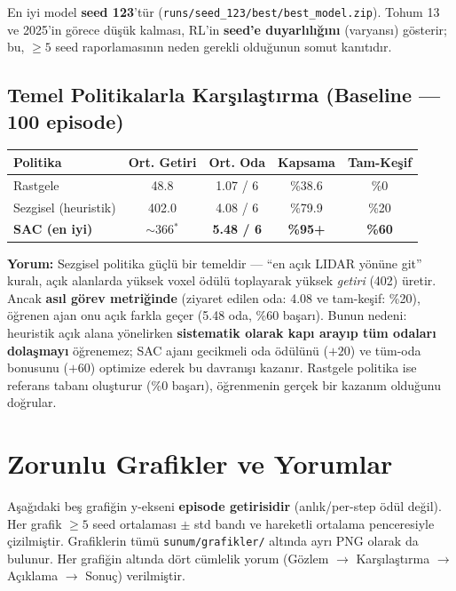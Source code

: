 \documentclass[11pt,a4paper]{article}
\begin{document}
En iyi model \textbf{seed 123}'tür (\texttt{runs/seed\_123/best/best\_model.zip}).
Tohum 13 ve 2025'in görece düşük kalması, RL'in \textbf{seed'e duyarlılığını}
(varyansı) gösterir; bu, $\ge 5$ seed raporlamasının neden gerekli olduğunun
somut kanıtıdır.

\subsection{Temel Politikalarla Karşılaştırma (Baseline --- 100 episode)}\label{sec:baseline}
\begin{center}
\begin{tabular}{lcccc}
\toprule
\textbf{Politika} & \textbf{Ort. Getiri} & \textbf{Ort. Oda} & \textbf{Kapsama} & \textbf{Tam-Keşif} \\
\midrule
Rastgele & 48.8 & 1.07 / 6 & \%38.6 & \%0 \\
Sezgisel (heuristik) & 402.0 & 4.08 / 6 & \%79.9 & \%20 \\
\textbf{SAC (en iyi)} & $\sim$366$^{*}$ & \textbf{5.48 / 6} & \textbf{\%95+} & \textbf{\%60} \\
\bottomrule
\end{tabular}
\end{center}

\noindent\textbf{Yorum:} Sezgisel politika güçlü bir temeldir --- ``en açık LIDAR
yönüne git'' kuralı, açık alanlarda yüksek voxel ödülü toplayarak yüksek
\emph{getiri} (402) üretir. Ancak \textbf{asıl görev metriğinde} (ziyaret edilen
oda: 4.08 ve tam-keşif: \%20), öğrenen ajan onu açık farkla geçer (5.48 oda,
\%60 başarı). Bunun nedeni: heuristik açık alana yönelirken \textbf{sistematik
olarak kapı arayıp tüm odaları dolaşmayı} öğrenemez; SAC ajanı gecikmeli oda
ödülünü ($+20$) ve tüm-oda bonusunu ($+60$) optimize ederek bu davranışı kazanır.
Rastgele politika ise referans tabanı oluşturur (\%0 başarı), öğrenmenin gerçek
bir kazanım olduğunu doğrular.

\section{Zorunlu Grafikler ve Yorumlar}
Aşağıdaki beş grafiğin y-ekseni \textbf{episode getirisidir} (anlık/per-step ödül
değil). Her grafik $\ge 5$ seed ortalaması $\pm$ std bandı ve hareketli ortalama
penceresiyle çizilmiştir. Grafiklerin tümü \texttt{sunum/grafikler/} altında ayrı
PNG olarak da bulunur. Her grafiğin altında dört cümlelik yorum (Gözlem
$\rightarrow$ Karşılaştırma $\rightarrow$ Açıklama $\rightarrow$ Sonuç) verilmiştir.
\end{document}
